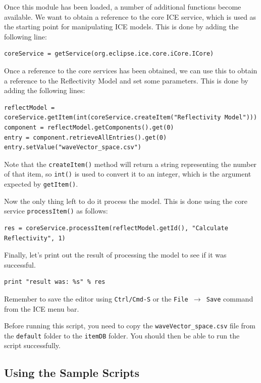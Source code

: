 Once this module has been loaded, a number of additional functions become
available. We want to obtain a reference to the core ICE service, which is used
as the starting point for manipulating ICE models. This is done by adding the
following line:

{\small
\begin{verbatim}
coreService = getService(org.eclipse.ice.core.iCore.ICore)
\end{verbatim}
}

Once a reference to the core services has been obtained, we can use this to
obtain a reference to the Reflectivity Model and set some parameters. This is
done by adding the following lines:

{\small
\begin{verbatim}
reflectModel = coreService.getItem(int(coreService.createItem("Reflectivity Model")))
component = reflectModel.getComponents().get(0)
entry = component.retrieveAllEntries().get(0)
entry.setValue("waveVector_space.csv")
\end{verbatim}
}

Note that the \texttt{createItem()} method will return a string representing the
number of that item, so \texttt{int()} is used to convert it to an integer, which is the
argument expected by \texttt{getItem()}.

Now the only thing left to do it process the model. This is done using the core
service \texttt{processItem()} as follows:

{\small
\begin{verbatim}
res = coreService.processItem(reflectModel.getId(), "Calculate Reflectivity", 1)
\end{verbatim}
}

Finally, let's print out the result of processing the model to see if it was
successful.

{\small
\begin{verbatim}
print "result was: %s" % res
\end{verbatim}
}

Remember to save the editor using \texttt{Ctrl/Cmd-S} or the \texttt{File
$\rightarrow$ Save} command from the ICE menu bar.

Before running this script, you need to copy the \texttt{waveVector\_space.csv}
file from the \texttt{default} folder to the \texttt{itemDB} folder. You should
then be able to run the script successfully.

\subsection{Using the Sample Scripts}

